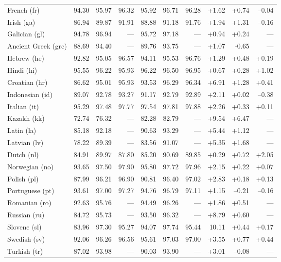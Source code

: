 \documentclass[11pt,a4paper]{article}
\begin{document}
\begin{table}[t]
\begin{tabular}{l|rrr|rrr|rrr}
French (fr) & 94.30 & 95.97 & 96.32 & 95.92 & 96.71 & 96.28 & +1.62 & +0.74 & --0.04\\
Irish (ga) & 86.94 & 89.87 & 91.91 & 88.88 & 91.18 & 91.76 & +1.94 & +1.31 & --0.16\\
Galician (gl) & 94.78 & 96.94 & --- & 95.72 & 97.18 & --- & +0.94 & +0.24 & ---\\
Ancient Greek (grc) & 88.69 & 94.40 & --- & 89.76 & 93.75 & --- & +1.07 & -0.65 & ---\\
Hebrew (he) & 92.82 & 95.05 & 96.57 & 94.11 & 95.53 & 96.76 & +1.29 & +0.48 & +0.19\\
Hindi (hi) & 95.55 & 96.22 & 95.93 & 96.22 & 96.50 & 96.95 & +0.67 & +0.28 & +1.02\\
Croatian (hr) & 86.62 & 95.01 & 95.93 & 93.53 & 96.29 & 96.34 & +6.91 & +1.28 & +0.41\\
Indonesian (id) & 89.07 & 92.78 & 93.27 & 91.17 & 92.79 & 92.89 & +2.11 & +0.02 & --0.38\\
Italian (it) & 95.29 & 97.48 & 97.77 & 97.54 & 97.81 & 97.88 & +2.26 & +0.33 & +0.11\\
Kazakh (kk) & 72.74 & 76.32 & --- & 82.28 & 82.79 & --- & +9.54 & +6.47 & ---\\
Latin (la) & 85.18 & 92.18 & --- & 90.63 & 93.29 & --- & +5.44 & +1.12 & ---\\
Latvian (lv) & 78.22 & 89.39 & --- & 83.56 & 91.07 & --- & +5.35 & +1.68 & ---\\
Dutch (nl) & 84.91 & 89.97 & 87.80 & 85.20 & 90.69 & 89.85 & +0.29 & +0.72 & +2.05\\
Norwegian (no) & 93.65 & 97.50 & 97.90 & 95.80 & 97.72 & 97.96 & +2.15 & +0.22 & +0.07\\
Polish (pl) & 87.99 & 96.21 & 96.90 & 90.81 & 96.40 & 97.02 & +2.83 & +0.18 & +0.13\\
Portuguese (pt) & 93.61 & 97.00 & 97.27 & 94.76 & 96.79 & 97.11 & +1.15 & --0.21 & --0.16\\
Romanian (ro) & 92.63 & 95.76 & --- & 94.49 & 96.26 & --- & +1.86 & +0.51 & ---\\
Russian (ru) & 84.72 & 95.73 & --- & 93.50 & 96.32 & --- & +8.79 & +0.60 & ---\\
Slovene (sl) & 83.96 & 97.30 & 95.27 & 94.07 & 97.74 & 95.44 & 10.11 & +0.44 & +0.17\\
Swedish (sv) & 92.06 & 96.26 & 96.56 & 95.61 & 97.03 & 97.00 & +3.55 & +0.77 & +0.44\\
Turkish (tr) & 87.02 & 93.98 & --- & 90.03 & 93.90 & --- & +3.01 & --0.08 & ---\\

\end{tabular}
\end{table}
\end{document}
